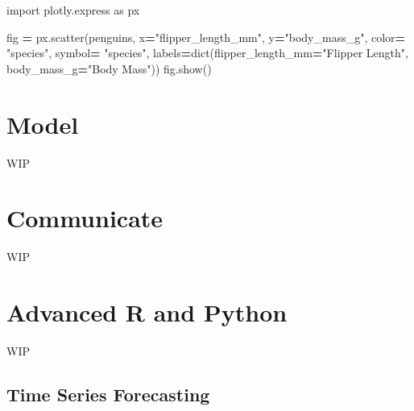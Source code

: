 \documentclass[]{book}
\newenvironment{Shaded}{\begin{snugshade}}{\end{snugshade}}
\newcommand{\BuiltInTok}[1]{#1}
\newcommand{\ImportTok}[1]{#1}
\newcommand{\NormalTok}[1]{#1}
\newcommand{\OperatorTok}[1]{\textcolor[rgb]{0.81,0.36,0.00}{\textbf{#1}}}
\newcommand{\StringTok}[1]{\textcolor[rgb]{0.31,0.60,0.02}{#1}}
\begin{document}
\begin{Shaded}
\begin{Highlighting}[]
\ImportTok{import}\NormalTok{ plotly.express }\ImportTok{as}\NormalTok{ px}

\NormalTok{fig }\OperatorTok{=}\NormalTok{ px.scatter(penguins,}
\NormalTok{                 x}\OperatorTok{=}\StringTok{"flipper_length_mm"}\NormalTok{,}
\NormalTok{                 y}\OperatorTok{=}\StringTok{"body_mass_g"}\NormalTok{,}
\NormalTok{                 color}\OperatorTok{=} \StringTok{"species"}\NormalTok{,}
\NormalTok{                 symbol}\OperatorTok{=} \StringTok{"species"}\NormalTok{,}
\NormalTok{                 labels}\OperatorTok{=}\BuiltInTok{dict}\NormalTok{(flipper_length_mm}\OperatorTok{=}\StringTok{"Flipper Length"}\NormalTok{,}
\NormalTok{                             body_mass_g}\OperatorTok{=}\StringTok{"Body Mass"}\NormalTok{))}
\NormalTok{fig.show()}
\end{Highlighting}
\end{Shaded}

\hypertarget{model}{%
\chapter{Model}\label{model}}

WIP

\hypertarget{communicate}{%
\chapter{Communicate}\label{communicate}}

WIP

\hypertarget{advanced-r-and-python}{%
\chapter{Advanced R and Python}\label{advanced-r-and-python}}

WIP

\hypertarget{time-series-forecasting}{%
\section{Time Series Forecasting}\label{time-series-forecasting}}
\end{document}

